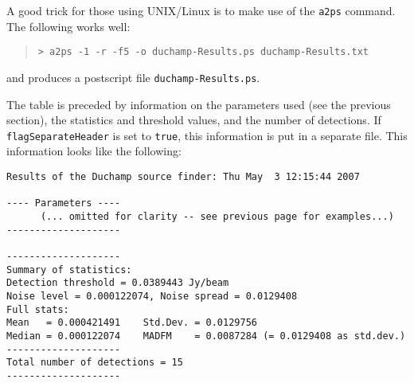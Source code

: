 A good trick for those using UNIX/Linux is to make use of the
\texttt{a2ps} command. The following works well:
\begin{quote}
{\footnotesize
\texttt{> a2ps -1 -r -f5 -o duchamp-Results.ps duchamp-Results.txt}
}
\end{quote}
and produces a postscript file \texttt{duchamp-Results.ps}.

The table is preceded by information on the parameters used (see the
previous section), the statistics and threshold values, and the number
of detections. If \texttt{flagSeparateHeader} is set to \texttt{true},
this information is put in a separate file. This information looks
like the following:

{\footnotesize
\begin{verbatim}
Results of the Duchamp source finder: Thu May  3 12:15:44 2007

---- Parameters ----
      (... omitted for clarity -- see previous page for examples...)
--------------------

--------------------
Summary of statistics:
Detection threshold = 0.0389443 Jy/beam
Noise level = 0.000122074, Noise spread = 0.0129408
Full stats:
Mean   = 0.000421491    Std.Dev. = 0.0129756
Median = 0.000122074    MADFM    = 0.0087284 (= 0.0129408 as std.dev.)
--------------------
Total number of detections = 15
--------------------
\end{verbatim}
}

